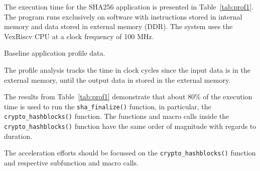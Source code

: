 The execution time for the SHA256 application is presented in
Table~\ref{tab:prof1}. The program runs exclusively on software with
instructions stored in internal memory and data stored in external memory
(DDR). The system uses the VexRiscv CPU at a clock frequency of 100 MHz.

\begin{table}[h]
    \centering
    
    \caption{Baseline application profile data.}
    \label{tab:prof1}
\end{table}

The profile analysis tracks the time in clock cycles since the input data is in
the external memory, until the output data in stored in the external memory.

The results from Table~\ref{tab:prof1} demonstrate that about 80\% of the
execution time is used to run the \texttt{sha\_finalize()} function, in
particular, the \texttt{crypto\_hashblocks()} function. The functions and macro
calls inside the \texttt{crypto\_hashblocks()} function have the same order of
magnitude with regards to duration.

The acceleration efforts should be focussed on the
\texttt{crypto\_hashblocks()} function and respective subfunction and macro
calls.


